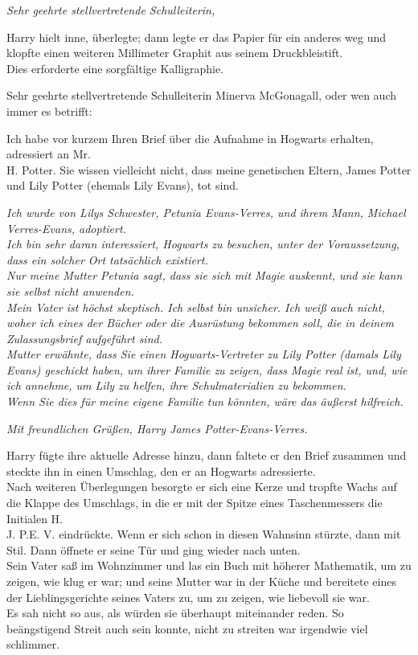 {\emph{Sehr geehrte stellvertretende Schulleiterin,}

Harry hielt inne, überlegte; dann legte er das Papier für ein anderes weg und klopfte einen weiteren Millimeter Graphit aus seinem Druckbleistift.\\ Dies erforderte eine sorgfältige Kalligraphie.

Sehr geehrte stellvertretende Schulleiterin Minerva McGonagall, oder wen auch immer es betrifft:

Ich habe vor kurzem Ihren Brief über die Aufnahme in Hogwarts erhalten, adressiert an Mr.\\ H. Potter. Sie wissen vielleicht nicht, dass meine genetischen Eltern, James Potter und Lily Potter (ehemals Lily Evans), tot sind.

\emph{Ich wurde von Lilys Schwester, Petunia Evans-Verres, und ihrem Mann, Michael Verres-Evans, adoptiert.\\ Ich bin sehr daran interessiert, Hogwarts zu besuchen, unter der Voraussetzung, dass ein solcher Ort tatsächlich existiert.\\ Nur meine Mutter Petunia sagt, dass sie sich mit Magie auskennt, und sie kann sie selbst nicht anwenden.\\ Mein Vater ist höchst skeptisch. Ich selbst bin unsicher. Ich weiß auch nicht, woher ich eines der Bücher oder die Ausrüstung bekommen soll, die in deinem Zulassungsbrief aufgeführt sind.\\ Mutter erwähnte, dass Sie einen Hogwarts-Vertreter zu Lily Potter (damals Lily Evans) geschickt haben, um ihrer Familie zu zeigen, dass Magie real ist, und, wie ich annehme, um Lily zu helfen, ihre Schulmaterialien zu bekommen.\\ Wenn Sie dies für meine eigene Familie tun könnten, wäre das äußerst hilfreich.}

\emph{Mit freundlichen Grüßen, Harry James Potter-Evans-Verres.}

Harry fügte ihre aktuelle Adresse hinzu, dann faltete er den Brief zusammen und steckte ihn in einen Umschlag, den er an Hogwarts adressierte.\\ Nach weiteren Überlegungen besorgte er sich eine Kerze und tropfte Wachs auf die Klappe des Umschlags, in die er mit der Spitze eines Taschenmessers die Initialen H.\\ J. P.E. V. eindrückte. Wenn er sich schon in diesen Wahnsinn stürzte, dann mit Stil. Dann öffnete er seine Tür und ging wieder nach unten.\\ Sein Vater saß im Wohnzimmer und las ein Buch mit höherer Mathematik, um zu zeigen, wie klug er war; und seine Mutter war in der Küche und bereitete eines der Lieblingsgerichte seines Vaters zu, um zu zeigen, wie liebevoll sie war.\\ Es sah nicht so aus, als würden sie überhaupt miteinander reden. So beängstigend Streit auch sein konnte, nicht zu streiten war irgendwie viel schlimmer.

}
